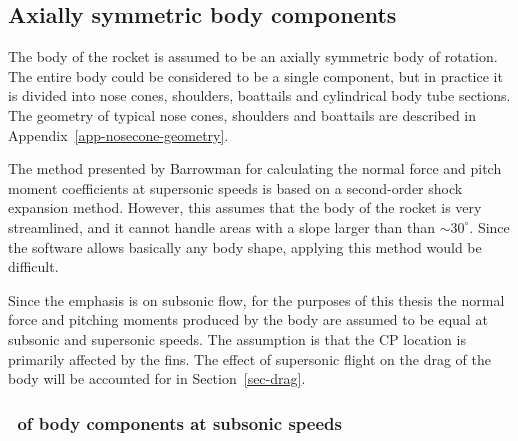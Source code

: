\subsection{Axially symmetric body components}

The body of the rocket is assumed to be an axially symmetric body of
rotation.  The entire body could be considered to be a single
component, but in practice it is divided into nose cones, shoulders,
boattails and cylindrical body tube sections.  The geometry of typical
nose cones, shoulders and boattails are described in
Appendix~\ref{app-nosecone-geometry}.

The method presented by Barrowman for calculating the normal force and
pitch moment coefficients at supersonic speeds is based on a
second-order shock expansion method.  However, this assumes that the
body of the rocket is very streamlined, and it cannot handle areas
with a slope larger than than $\sim30^\circ$.  Since the software
allows basically any body shape, applying this method would be
difficult.

Since the emphasis is on subsonic flow, for the purposes of this
thesis the normal force and pitching moments produced by the body are
assumed to be equal at subsonic and supersonic speeds.  The assumption
is that the CP location is primarily affected by the fins.  The effect
of supersonic flight on the drag of the body will be accounted for in
Section~\ref{sec-drag}.



\subsubsection{\CNa\ of body components at subsonic speeds}

